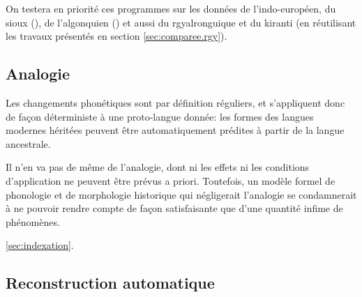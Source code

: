 \documentclass[oldfontcommands,oneside,a4paper,11pt]{article}
\begin{document}
On testera en priorité ces programmes sur les données de l'indo-européen, du sioux (\citealt{csd2006}), de l'algonquien (\citealt{hewson11roots}) et aussi du rgyalronguique et du kiranti (en réutilisant les travaux présentés en section \ref{sec:comparee.rgy}).

\subsection{Analogie}
Les changements phonétiques sont par définition réguliers, et s'appliquent donc de façon déterministe à une proto-langue donnée: les formes des langues modernes héritées peuvent être automatiquement prédites à partir de la langue ancestrale.

Il n'en va pas de même de l'analogie, dont ni les effets ni les conditions d'application ne peuvent être prévus a priori. Toutefois, un modèle formel de phonologie et de morphologie historique qui négligerait l'analogie se condamnerait à ne pouvoir rendre compte de façon satisfaisante que d'une quantité infime de phénomènes.  

\ref{sec:indexation}.

\subsection{Reconstruction automatique}



 
\end{document}
